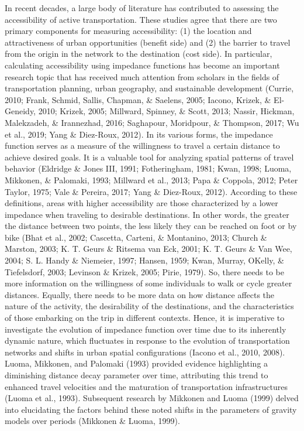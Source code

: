 \documentclass[
11pt, %
oneside, %
english, %
singlespacing, %
]{macthesis} %
\begin{document}
In recent decades, a large body of literature has contributed to assessing the accessibility of active transportation. These studies agree that there are two primary components for measuring accessibility: (1) the location and attractiveness of urban opportunities (benefit side) and (2) the barrier to travel from the origin in the network to the destination (cost side). In particular, calculating accessibility using impedance functions has become an important research topic that has received much attention from scholars in the fields of transportation planning, urban geography, and sustainable development (Currie, 2010; Frank, Schmid, Sallis, Chapman, \& Saelens, 2005; Iacono, Krizek, \& El-Geneidy, 2010; Krizek, 2005; Millward, Spinney, \& Scott, 2013; Nassir, Hickman, Malekzadeh, \& Irannezhad, 2016; Saghapour, Moridpour, \& Thompson, 2017; Wu et al., 2019; Yang \& Diez-Roux, 2012). In its various forms, the impedance function serves as a measure of the willingness to travel a certain distance to achieve desired goals. It is a valuable tool for analyzing spatial patterns of travel behavior (Eldridge \& Jones III, 1991; Fotheringham, 1981; Kwan, 1998; Luoma, Mikkonen, \& Palomaki, 1993; Millward et al., 2013; Papa \& Coppola, 2012; Peter Taylor, 1975; Vale \& Pereira, 2017; Yang \& Diez-Roux, 2012). According to these definitions, areas with higher accessibility are those characterized by a lower impedance when traveling to desirable destinations. In other words, the greater the distance between two points, the less likely they can be reached on foot or by bike (Bhat et al., 2002; Cascetta, Carteni, \& Montanino, 2013; Church \& Marston, 2003; K. T. Geurs \& Ritsema van Eck, 2001; K. T. Geurs \& Van Wee, 2004; S. L. Handy \& Niemeier, 1997; Hansen, 1959; Kwan, Murray, OKelly, \& Tiefelsdorf, 2003; Levinson \& Krizek, 2005; Pirie, 1979). So, there needs to be more information on the willingness of some individuals to walk or cycle greater distances. Equally, there needs to be more data on how distance affects the nature of the activity, the desirability of the destinations, and the characteristics of those embarking on the trip in different contexts. Hence, it is imperative to investigate the evolution of impedance function over time due to its inherently dynamic nature, which fluctuates in response to the evolution of transportation networks and shifts in urban spatial configurations (Iacono et al., 2010, 2008). Luoma, Mikkonen, and Palomaki (1993) provided evidence highlighting a diminishing distance decay parameter over time, attributing this trend to enhanced travel velocities and the maturation of transportation infrastructures (Luoma et al., 1993). Subsequent research by Mikkonen and Luoma (1999) delved into elucidating the factors behind these noted shifts in the parameters of gravity models over periods (Mikkonen \& Luoma, 1999).
\end{document}
